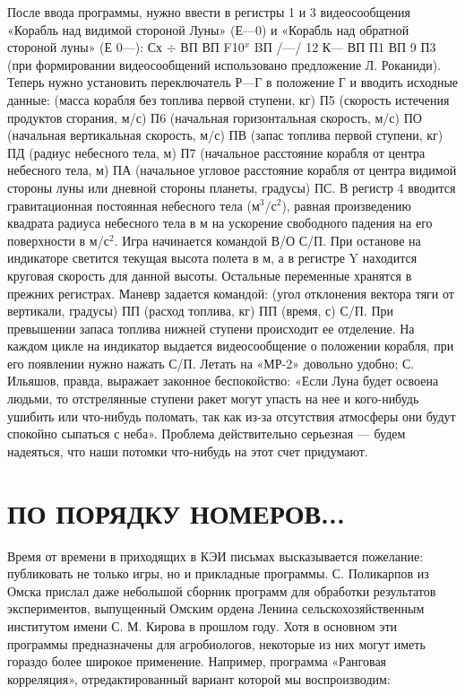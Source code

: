 \documentclass[11pt,a4paper,oneside]{article}
\begin{document}
После ввода программы, нужно ввести в регистры 1 и 3 видеосообщения «Корабль над видимой стороной Луны» (Е—0) и «Корабль над обратной стороной луны» (Е 0—): Сх $\div$ ВП ВП F10$^{x}$ BП /—/ 12 К— ВП П1 ВП 9 П3 (при формировании видеосообщений использовано предложение Л. Роканиди). Теперь нужно установить переключатель Р—Г в положение Г и вводить исходные данные: (масса корабля без топлива первой ступени, кг) П5 (скорость истечения продуктов сгорания, м/с) П6 (начальная горизонтальная скорость, м/с) ПО (начальная вертикальная скорость, м/с) ПВ (запас топлива первой ступени, кг) ПД (радиус небесного тела, м) П7 (начальное расстояние корабля от центра небесного тела, м) ПА (начальное угловое расстояние корабля от центра видимой стороны луны или дневной стороны планеты, градусы) ПС. В регистр 4 вводится гравитационная постоянная небесного тела (м$^{3}$/с$^{2}$), равная произведению квадрата радиуса небесного тела в м на ускорение свободного падения на его поверхности в м/с$^{2}$. Игра начинается командой В/О С/П. При останове на индикаторе светится текущая высота полета в м, а в регистре Y находится круговая скорость для данной высоты. Остальные переменные хранятся в прежних регистрах. Маневр задается командой: (угол отклонения вектора тяги от вертикали, градусы) ПП (расход топлива, кг) ПП (время, с) С/П. При превышении запаса топлива нижней ступени происходит ее отделение. На каждом цикле на индикатор выдается видеосообщение о положении корабля, при его появлении нужно нажать С/П. Летать на «МР-2» довольно удобно; С. Ильяшов, правда, выражает законное беспокойство: «Если Луна будет освоена людьми, то отстрелянные ступени ракет могут упасть на нее и кого-нибудь ушибить или что-нибудь поломать, так как из-за отсутствия атмосферы они будут спокойно сыпаться с неба». Проблема действительно серьезная — будем надеяться, что наши потомки что-нибудь на этот счет придумают.

\section{ПО ПОРЯДКУ НОМЕРОВ...}
Время от времени в приходящих в КЭИ письмах высказывается пожелание: публиковать не только игры, но и прикладные программы. С. Поликарпов из Омска прислал даже небольшой сборник программ для обработки результатов экспериментов, выпущенный Омским ордена Ленина сельскохозяйственным институтом имени С. М. Кирова в прошлом году. Хотя в основном эти программы предназначены для агробиологов, некоторые из них могут иметь гораздо более широкое применение. Например, программа «Ранговая корреляция», отредактированный вариант которой мы воспроизводим:
\end{document}
